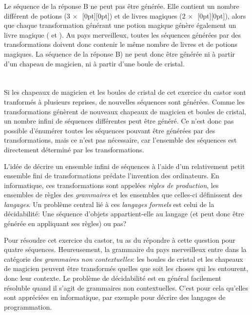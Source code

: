 {{Le séquence de la réponse B ne peut pas être générée. Elle contient un nombre différent de potions (${3\,\times}$~\raisebox{-0.5ex}[0pt][0pt]{}) et de livres magiques (${2\,\times}$~\raisebox{-0.5ex}[0pt][0pt]{}), alors que chaque transformation générant une potion magique génère également un livre magique (\raisebox{-0.5ex}{} et \raisebox{-0.5ex}{}). Au pays merveilleux, toutes les séquences générées par des transformations doivent donc contenir le même nombre de livres et de potions magiques. La séquence de la réponse B) ne peut donc être générée ni à partir d’un chapeau de magicien, ni à partir d’une boule de cristal.



\section*{\BrochureItsInformatics}
Si les chapeaux de magicien et les boules de cristal de cet exercice du castor sont tranformés à plusieurs reprises, de nouvelles séquences sont générées. Comme les transformations génèrent de nouveaux chapeaux de magicien et boules de cristal, un nombre infini de séquences différentes peut être généré. Ce n’est donc pas possible d’énumérer toutes les séquences pouvant être générées par des transformations, mais ce n’est pas nécessaire, car l’ensemble des séquences est directement déterminé par les transformations.

L’idée de décrire un ensemble infini de séquences à l’aide d’un relativement petit ensemble fini de transformations prédate l’invention des ordinateurs. En informatique, ces transformations sont appelées \emph{règles de production}, les ensembles de règles des \emph{grammaires} et les ensembles que celles-ci définissent des \emph{langages}. Un problème central lié à ces \emph{langages formels} est celui de la décidabilité: Une séquence d’objets appartient-elle au langage (et peut donc être générée en appliquant ses règles) ou pas?

Pour résoudre cet exercice du castor, tu as du répondre à cette question pour quatre séquences. Heureusement, la grammaire du pays merveilleux entre dans la catégorie des \emph{grammaires non contextuelles}: les boules de cristal et les chapeaux de magicien peuvent être transformés quelles que soit les choses qui les entourent, donc leur contexte. Le problème de décidabilité est en général facilement résoluble quand il s’agit de grammaires non contextuelles. C’est pour cela qu’elles sont appréciées en informatique, par exemple pour décrire des langages de programmation.



}}

